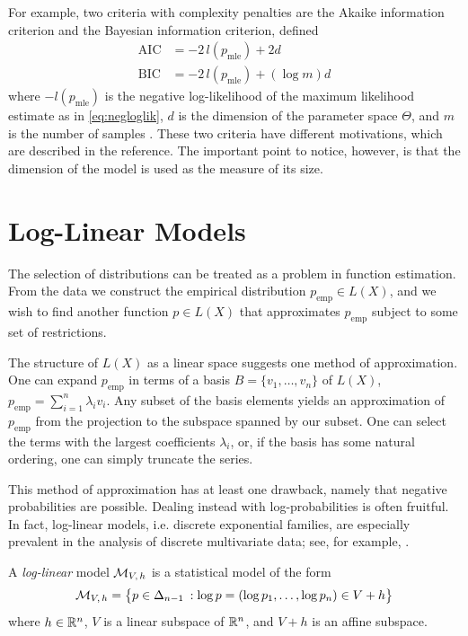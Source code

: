 \documentclass[cclicense]{hmcthesis}
\newcommand*{\mle}{\mathrm{mle}}
\newcommand*{\emp}{\mathrm{emp}}
\numberwithin{equation}{chapter}
\numberwithin{ucounter}{chapter}
\begin{document}
    For example, two criteria with complexity penalties are the Akaike
    information criterion and the Bayesian information criterion, defined
    \begin{align*}
        \mathrm{AIC} &= -2\,l(p_\mle) + 2d \\
        \mathrm{BIC} &= -2\,l(p_\mle) + (\log m) d
    \end{align*}
    where $-l(p_\mle)$ is the negative log-likelihood of the maximum likelihood
    estimate as in \eqref{eq:negloglik}, $d$ is the dimension of the parameter
    space $\Theta$, and $m$ is the number of samples \citep{EOSL}.  These two
    criteria have different motivations, which are described in the reference.
    The important point to notice, however, is that the dimension of the model
    is used as the measure of its size.

\section{Log-Linear Models}
    \label{sec:linear-models}
    
    The selection of distributions can be treated as a problem in function
    estimation.  From the data we construct the empirical distribution \mbox{$p_\emp
    \in L(X)$}, and we wish to find another function $p \in L(X)$ that
    approximates $p_\emp$ subject to some set of restrictions.  
    
    The structure of $L(X)$ as a linear space suggests one method of
    approximation.  One can expand $p_\emp$ in terms of a basis $B = \{v_1,
    \ldots, v_n\}$ of $L(X)$, $p_\emp = \sum_{i=1}^n \lambda_i v_i$.  Any subset
    of the basis elements yields an approximation of $p_\emp$ from the
    projection to the subspace spanned by our subset.  One can select the terms
    with the largest coefficients $\lambda_i$, or, if the basis has some natural
    ordering, one can simply truncate the series.

    This method of approximation has at least one drawback, namely that negative
    probabilities are possible.  Dealing instead with log-probabilities is often
    fruitful.  In fact, log-linear models, i.e. discrete exponential families,
    are especially prevalent in the analysis of discrete multivariate data; see,
    for example, \citet{DMA}.
    \begin{definition}
        A \emph{log-linear} model $\ms_{V\!,\,h}$ is a statistical model of the form
        \[
            \ms_{V\!,\,h} = \cdel[\big]{p \in \Delta_{n-1} \:: \log p = (\log p_1, \ldots,
            \log p_n) \in V + h}
        \]
        where $h \in \R^n$, $V$ is a linear subspace of $\R^n$, and $V + h$ is
        an affine subspace.
    \end{definition}
\end{document}
